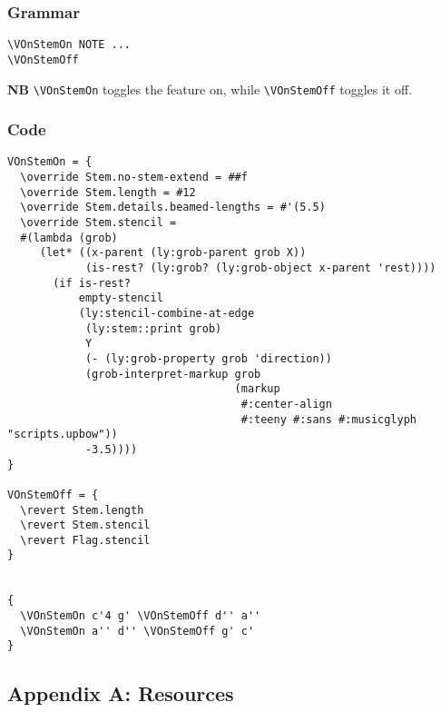 \documentclass[11pt, oneside]{book}   	%
\begin{document}
\subsection{Grammar}
\begin{verbatim}
\VOnStemOn NOTE ...
\VOnStemOff
\end{verbatim}
\textbf{NB} \verb|\VOnStemOn| toggles the feature on, while \verb|\VOnStemOff| toggles it off.

\subsection{Code}
\begin{verbatim}
VOnStemOn = {
  \override Stem.no-stem-extend = ##f
  \override Stem.length = #12
  \override Stem.details.beamed-lengths = #'(5.5)
  \override Stem.stencil =
  #(lambda (grob)
     (let* ((x-parent (ly:grob-parent grob X))
            (is-rest? (ly:grob? (ly:grob-object x-parent 'rest))))
       (if is-rest?
           empty-stencil
           (ly:stencil-combine-at-edge
            (ly:stem::print grob)
            Y
            (- (ly:grob-property grob 'direction))
            (grob-interpret-markup grob
                                   (markup
                                    #:center-align
                                    #:teeny #:sans #:musicglyph "scripts.upbow"))
            -3.5))))
}

VOnStemOff = {
  \revert Stem.length
  \revert Stem.stencil
  \revert Flag.stencil
}


{
  \VOnStemOn c'4 g' \VOnStemOff d'' a''
  \VOnStemOn a'' d'' \VOnStemOff g' c'
}
\end{verbatim}
\vfill \break




\clearpage







\backmatter

\printbibliography[heading=bibintoc, title={Bibliography}]

\begin{appendices}
\chapter{Appendix A: Resources}

\end{appendices}
\end{document}
